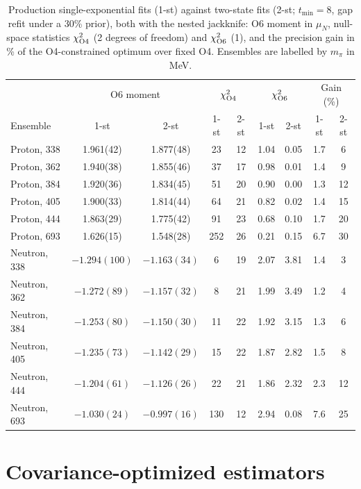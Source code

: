 \documentclass[aps,prd,reprint,twocolumn,superscriptaddress,nofootinbib,longbibliography]{revtex4-2}
\begin{document}
\begin{table}[t]
\caption{Production single-exponential fits (1-st) against two-state fits (2-st; $t_{\min}=8$, gap refit under a 30\% prior), both with the nested jackknife: O6 moment in $\mu_N$, null-space statistics $\chi^2_{\rm O4}$ (2 degrees of freedom) and $\chi^2_{\rm O6}$ (1), and the precision gain in \% of the O4-constrained optimum over fixed O4. Ensembles are labelled by $m_\pi$ in MeV.}
\label{tab:twostate}
\centering
\setlength{\tabcolsep}{6pt}\begin{tabular}{lcccccccc}
\toprule
 & \multicolumn{2}{c}{O6 moment} & \multicolumn{2}{c}{$\chi^2_{\rm O4}$} & \multicolumn{2}{c}{$\chi^2_{\rm O6}$} & \multicolumn{2}{c}{Gain (\%)}\\
Ensemble & 1-st & 2-st & 1-st & 2-st & 1-st & 2-st & 1-st & 2-st\\
\midrule
Proton, 338 & 1.961(42) & 1.877(48) & 23 & 12 & 1.04 & 0.05 & 1.7 & 6\\
Proton, 362 & 1.940(38) & 1.855(46) & 37 & 17 & 0.98 & 0.01 & 1.4 & 9\\
Proton, 384 & 1.920(36) & 1.834(45) & 51 & 20 & 0.90 & 0.00 & 1.3 & 12\\
Proton, 405 & 1.900(33) & 1.814(44) & 64 & 21 & 0.82 & 0.02 & 1.4 & 15\\
Proton, 444 & 1.863(29) & 1.775(42) & 91 & 23 & 0.68 & 0.10 & 1.7 & 20\\
Proton, 693 & 1.626(15) & 1.548(28) & 252 & 26 & 0.21 & 0.15 & 6.7 & 30\\
\midrule
Neutron, 338 & $-1.294(100)$ & $-1.163(34)$ & 6 & 19 & 2.07 & 3.81 & 1.4 & 3\\
Neutron, 362 & $-1.272(89)$ & $-1.157(32)$ & 8 & 21 & 1.99 & 3.49 & 1.2 & 4\\
Neutron, 384 & $-1.253(80)$ & $-1.150(30)$ & 11 & 22 & 1.92 & 3.15 & 1.3 & 6\\
Neutron, 405 & $-1.235(73)$ & $-1.142(29)$ & 15 & 22 & 1.87 & 2.82 & 1.5 & 8\\
Neutron, 444 & $-1.204(61)$ & $-1.126(26)$ & 22 & 21 & 1.86 & 2.32 & 2.3 & 12\\
Neutron, 693 & $-1.030(24)$ & $-0.997(16)$ & 130 & 12 & 2.94 & 0.08 & 7.6 & 25\\
\bottomrule
\end{tabular}
\end{table}

\section{Covariance-optimized estimators}
\label{sec:blue}
\end{document}
